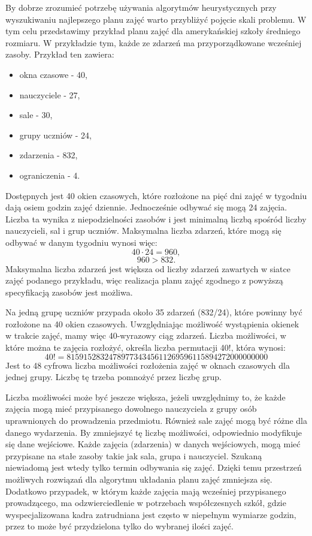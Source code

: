 By dobrze zrozumieć potrzebę używania algorytmów heurystycznych przy wyszukiwaniu najlepszego planu zajęć warto przybliżyć pojęcie skali problemu. W tym celu przedstawimy przykład planu zajęć dla amerykańskiej szkoły średniego rozmiaru. W przykładzie tym, każde ze zdarzeń ma przyporządkowane wcześniej zasoby. Przykład ten zawiera:

\begin{itemize}
	\item okna czasowe - 40,
	\item nauczyciele - 27,
	\item sale - 30,
	\item grupy uczniów - 24,
	\item zdarzenia - 832,
	\item ograniczenia - 4.
\end{itemize}

Dostępnych jest 40 okien czasowych, które rozłożone na pięć dni zajęć w tygodniu dają osiem godzin zajęć dziennie. Jednocześnie odbywać się mogą 24 zajęcia. Liczba ta wynika z niepodzielności zasobów i jest minimalną liczbą spośród liczby nauczycieli, sal i grup uczniów. Maksymalna liczba zdarzeń, które mogą się odbywać w danym tygodniu wynosi więc:
\[ 40 \cdot 24 = 960, \]
\[ 960 > 832. \]
Maksymalna liczba zdarzeń jest większa od liczby zdarzeń zawartych w siatce zajęć podanego przykładu, więc realizacja  planu zajęć zgodnego z powyższą specyfikacją zasobów jest możliwa.

Na jedną grupę uczniów przypada około 35 zdarzeń (832/24), które powinny być rozłożone na 40 okien czasowych. Uwzględniając możliwość wystąpienia okienek w trakcie zajęć, mamy więc 40-wyrazowy ciąg zdarzeń. Liczba możliwości, w które można te zajęcia rozłożyć, określa liczba permutacji 40!, która wynosi:
\[40! = 815915283247897734345611269596115894272000000000\]
Jest to 48 cyfrowa liczba możliwości rozłożenia zajęć w oknach czasowych dla jednej grupy. Liczbę tę trzeba pomnożyć przez liczbę grup.

Liczba możliwości może być jeszcze większa, jeżeli uwzględnimy to, że każde zajęcia mogą mieć przypisanego dowolnego nauczyciela z grupy osób uprawnionych do prowadzenia przedmiotu. Również sale zajęć mogą być różne dla danego wydarzenia. By zmniejszyć tę liczbę możliwości, odpowiednio modyfikuje się dane wejściowe. Każde zajęcia (zdarzenia) w danych wejściowych, mogą mieć przypisane na stałe zasoby takie jak sala, grupa i nauczyciel. Szukaną niewiadomą jest wtedy tylko termin odbywania się zajęć. Dzięki temu przestrzeń możliwych rozwiązań dla algorytmu układania planu zajęć zmniejsza się. Dodatkowo przypadek, w którym każde zajęcia mają wcześniej przypisanego prowadzącego, ma odzwierciedlenie w potrzebach współczesnych szkół, gdzie wyspecjalizowana kadra zatrudniana jest często w niepełnym wymiarze godzin, przez to może być przydzielona tylko do wybranej ilości zajęć.

